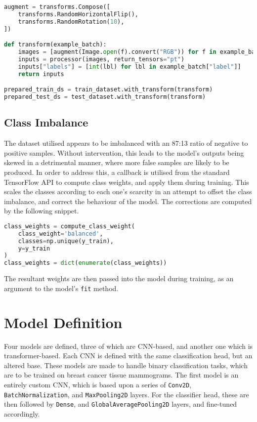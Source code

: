 \documentclass[../main]{subfiles}
\begin{document}
\begin{lstlisting}[language=Python, caption={Data augmentation for the ViT model.}]
augment = transforms.Compose([
    transforms.RandomHorizontalFlip(),
    transforms.RandomRotation(10),
])

def transform(example_batch):
    images = [augment(Image.open(f).convert("RGB")) for f in example_batch["file"]]
    inputs = processor(images, return_tensors="pt")
    inputs["labels"] = [int(lbl) for lbl in example_batch["label"]]
    return inputs

prepared_train_ds = train_dataset.with_transform(transform)
prepared_test_ds = test_dataset.with_transform(transform)
\end{lstlisting}

\subsection{Class Imbalance}
The dataset utilised appears to be imbalanced with
an 87:13 ratio of negative to positive samples. Without intervention, this leads
to the model's outputs being skewed in a detrimental manner, where more false
samples are likely to be produced. In order to address this, a callback is
utilised from the standard TensorFlow API to compute class weights, and apply
them during training. This scales the classes according to each one's scarcity
in an attempt to offset the class imbalance, and correct the behaviour of the
model. The corrections are computed by the following snippet.

\begin{lstlisting}[language=Python, caption={Correcting the class imbalance.}]
class_weights = compute_class_weight(
    class_weight='balanced',
    classes=np.unique(y_train),
    y=y_train
)
class_weights = dict(enumerate(class_weights))
\end{lstlisting}

\noindent The resultant weights are then passed into the model during training,
as an argument to the model's \texttt{fit} method.

\section{Model Definition}
Four models are defined, three of which are CNN-based, and another one which is
transformer-based. Each CNN is defined with the same classification head, but
an altered base. These models are made to handle binary classification tasks,
which are to be trained on breast cancer tissue mammograms. The first model is
an entirely custom CNN, which is based upon a series of \texttt{Conv2D},
\texttt{BatchNormalization}, and \texttt{MaxPooling2D} layers. For the
classifier head, these are then followed by \texttt{Dense}, and
\texttt{GlobalAveragePooling2D} layers, and fine-tuned accordingly.
\end{document}
